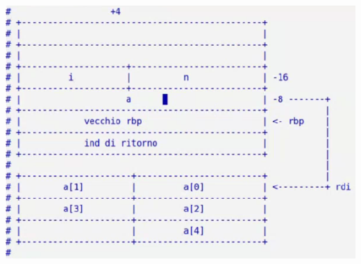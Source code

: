 \documentclass[11pt]{report}
\theoremstyle{definition}
\begin{document}
\begin{center}
\includegraphics[scale=.9]{img/32.PNG}
\end{center} 
\end{document}
